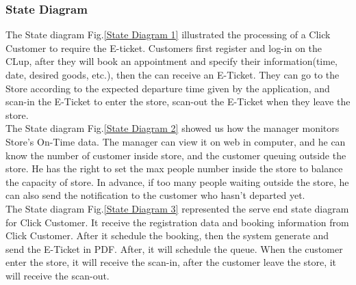 \documentclass[a4paper,12pt]{report}
\begin{document}
\subsubsection{State Diagram}

The State diagram Fig.\ref{State Diagram 1} illustrated the processing of a Click Customer to require the E-ticket. Customers first register and log-in on the CLup, after they will book an appointment and specify their information(time, date, desired goods, etc.), then the can receive an E-Ticket. They can go to the Store according to the expected departure time given by the application, and scan-in the E-Ticket to enter the store, scan-out the E-Ticket when they leave the store. \\



The State diagram Fig.\ref{State Diagram 2} showed us how the manager monitors Store's On-Time data. The manager can view it on web in computer, and he can know the number of customer inside store, and the customer queuing outside the store. He has the right to set the max people number inside the store to balance the capacity of store. In advance, if too many people waiting outside the store, he can also send the notification to the customer who hasn't departed yet. \\



The State diagram Fig.\ref{State Diagram 3} represented the serve end state diagram for Click Customer. It receive the registration data and booking information from Click Customer. After it schedule the booking, then the system generate and send the E-Ticket in PDF. After, it will schedule the queue. When the customer enter the store, it will receive the scan-in, after the customer leave the store, it will receive the scan-out.
\end{document}
